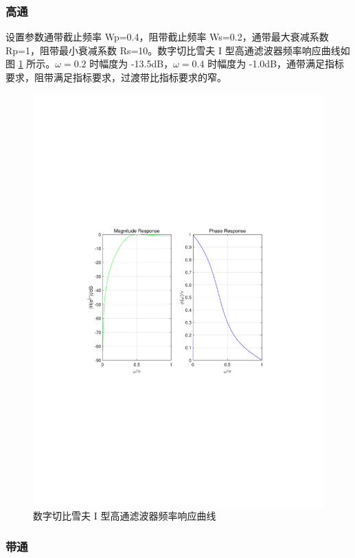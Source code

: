 \documentclass[12pt,AutoFakeBold]{article}
\begin{document}
\subsubsection{高通}

设置参数通带截止频率 Wp=0.4，阻带截止频率 Ws=0.2，通带最大衰减系数 Rp=1，阻带最小衰减系数 Rs=10。数字切比雪夫 I 型高通滤波器频率响应曲线如图 \ref{fig:HPC1F} 所示。$\omega=0.2$ 时幅度为 -13.5dB，$\omega=0.4$ 时幅度为 -1.0dB，通带满足指标要求，阻带满足指标要求，过渡带比指标要求的窄。

\begin{figure}[hbtp]
	\centering
	\includegraphics[width=14cm]{figure/HPC1F.pdf}
	\caption{数字切比雪夫 I 型高通滤波器频率响应曲线} \label{fig:HPC1F}
\end{figure}

\subsubsection{带通}
\end{document}
